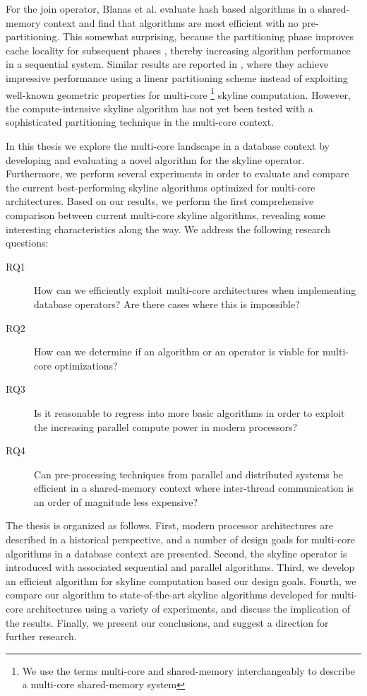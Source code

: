 \documentclass[12pt,a4paper,twoside]{report}
\begin{document}
For the join operator, Blanas et al. \cite{blanas2011design} evaluate
hash based algorithms \cite{bratbergsengen1984hashing} in a
shared-memory context and find that algorithms are most efficient with
no pre-partitioning. This somewhat surprising, because the
partitioning phase improves cache locality for subsequent phases
\cite{shatdal1994cache}, thereby increasing algorithm performance in a
sequential system. Similar results are reported in
\cite{park2009parallel}, where they achieve impressive performance
using a linear partitioning scheme instead of exploiting well-known
geometric properties for multi-core \footnote{We use the terms
multi-core and shared-memory interchangeably to describe a multi-core
shared-memory system} skyline computation.  However, the
compute-intensive skyline algorithm has not yet been tested with a
sophisticated partitioning technique in the multi-core context. 

In this thesis we explore the multi-core landscape in a database
context by developing and evaluating a novel algorithm for the skyline
operator. Furthermore, we perform several experiments in order to
evaluate and compare the current best-performing skyline algorithms
optimized for multi-core architectures. Based on our results, we
perform the first comprehensive comparison between current multi-core
skyline algorithms, revealing some interesting characteristics along
the way. We address the following research questions:

\begin{description}
	\item[RQ1] How can we efficiently exploit multi-core architectures
	when implementing database operators? Are there cases where this
	is impossible?
	\item[RQ2] How can we determine if an algorithm or an operator is
	viable for multi-core optimizations? 	
	\item[RQ3] Is it reasonable to regress into more basic algorithms
	in order to exploit the increasing parallel compute power in
	modern processors?
	\item[RQ4] Can pre-processing techniques from parallel and
	distributed systems be efficient in a shared-memory context where
	inter-thread communication is an order of magnitude less
	expensive?  
\end{description}

The thesis is organized as follows. First, modern processor
architectures are described in a historical perspective, and a number
of design goals for multi-core algorithms in a database context are
presented. Second, the skyline operator is introduced with associated
sequential and parallel algorithms. Third, we develop an efficient
algorithm for skyline computation based our design goals.  Fourth, we
compare our algorithm to state-of-the-art skyline algorithms developed
for multi-core architectures using a variety of experiments, and
discuss the implication of the results. Finally, we present our
conclusions, and suggest a direction for further research.
\end{document}
